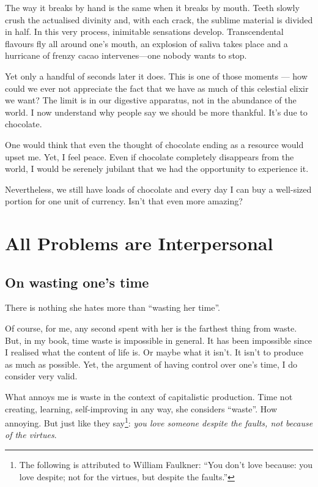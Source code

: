 The way it breaks by hand is the same when it breaks by mouth. Teeth slowly crush the actualised divinity and, with each crack, the sublime material is divided in half. In this very process, inimitable sensations develop. Transcendental flavours fly all around one’s mouth, an explosion of saliva takes place and a hurricane of frenzy cacao intervenes—one nobody wants to stop.

Yet only a handful of seconds later it does. This is one of those moments — how could we ever not appreciate the fact that we have as much of this celestial elixir we want? The limit is in our digestive apparatus, not in the abundance of the world. I now understand why people say we should be more thankful. It’s due to chocolate.

One would think that even the thought of chocolate ending as a resource would upset me. Yet, I feel peace. Even if chocolate completely disappears from the world, I would be serenely jubilant that we had the opportunity to experience it.

Nevertheless, we still have loads of chocolate and every day I can buy a well-sized portion for one unit of currency. Isn’t that even more amazing?

\chapter{All Problems are Interpersonal}

\section{On wasting one’s time}

There is nothing she hates more than “wasting her time”.

Of course, for me, any second spent with her is the farthest thing from waste. But, in my book, time waste is impossible in general. It has been impossible since I realised what the content of life is. Or maybe what it isn’t. It isn’t to produce as much as possible. Yet, the argument of having control over one’s time, I do consider very valid.

What annoys me is waste in the context of capitalistic production. Time not creating, learning, self-improving in any way, she considers “waste”. How annoying. But just like they say\footnote{The following is attributed to William Faulkner: “You don’t love because: you love despite; not for the virtues, but despite the faults.”}: \emph{you love someone despite the faults, not because of the virtues}.

